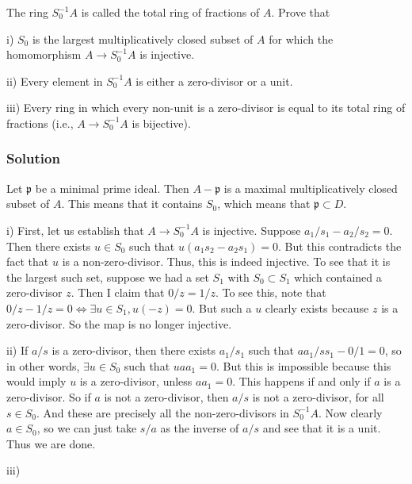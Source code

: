 \documentclass[book,12pt,oneside,openany]{memoir}
\begin{document}
The ring $S_{0}^{-1}A$ is called the total ring of fractions of $A$. Prove that

i) $S_0$ is the largest multiplicatively closed subset of $A$ for which the homomorphism $A \rightarrow S_0^{-1}A$ is injective.

ii) Every element in $S_{0}^{-1}A$ is either a zero-divisor or a unit.

iii) Every ring in which every non-unit is a zero-divisor is equal to its total ring of fractions (i.e., $A \rightarrow S_0^{-1}A$ is bijective).


\subsection{Solution}
Let $\mathfrak{p}$ be a minimal prime ideal. Then $A-\mathfrak{p}$ is a maximal multiplicatively closed subset of $A$. This means that it contains $S_0$, which means that $\mathfrak{p} \subset D$.

i) First, let us establish that $A \rightarrow S_{0}^{-1}A$ is injective. Suppose $a_1/s_1 - a_2/s_2 = 0$. Then there exists $u \in S_0$ such that $u(a_1 s_2 - a_2 s_1) = 0$. But this contradicts the fact that $u$ is a non-zero-divisor. Thus, this is indeed injective. To see that it is the largest such set, suppose we had a set $S_1$ with $S_0 \subset S_1$ which contained a zero-divisor $z$. Then I claim that $0/z = 1/z$. To see this, note that $0/z - 1/z = 0 \Leftrightarrow \exists u \in S_1, u(-z) = 0$. But such a $u$ clearly exists because $z$ is a zero-divisor. So the map is no longer injective.

ii) If $a/s$ is a zero-divisor, then there exists $a_1/s_1$ such that $aa_1/ss_1 - 0/1 = 0$, so in other words, $\exists u \in S_0$ such that $uaa_1 = 0$. But this is impossible because this would imply $u$ is a zero-divisor, unless $aa_1 = 0$. This happens if and only if $a$ is a zero-divisor. So if $a$ is not a zero-divisor, then $a/s$ is not a zero-divisor, for all $s \in S_0$. And these are precisely all the non-zero-divisors in $S_0^{-1}A$. Now clearly $a \in S_0$, so we can just take $s/a$ as the inverse of $a/s$ and see that it is a unit. Thus we are done.

iii) 



\chapter{}

\section{}
\end{document}
